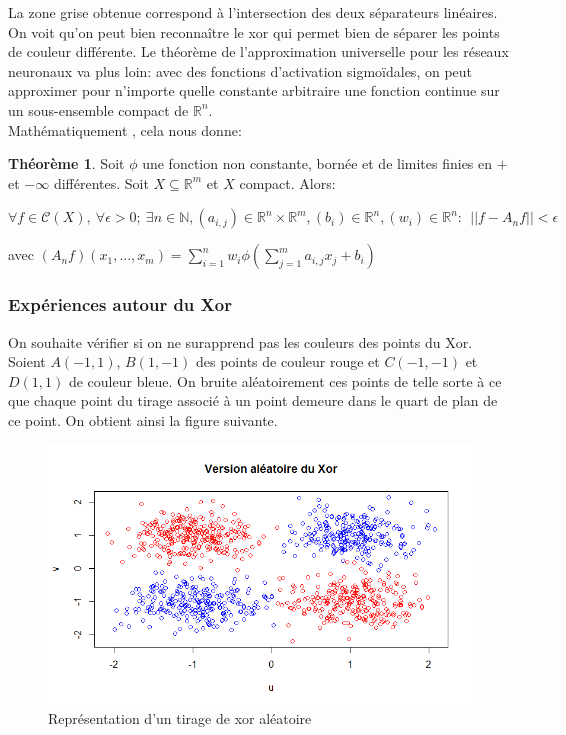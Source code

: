 \documentclass{article}
\theoremstyle{definition}
\newtheorem{thm}{Théorème}
\newcommand{\R}{\mathbb R}
\begin{document}
\noindent La zone grise obtenue correspond à l'intersection des deux séparateurs linéaires. On voit qu'on peut bien reconnaître le xor qui permet bien de séparer les points de couleur différente. Le théorème de l'approximation universelle pour les réseaux neuronaux va plus loin: avec des fonctions d'activation sigmoïdales, on peut approximer pour n'importe quelle constante arbitraire une fonction continue sur un sous-ensemble compact de $\R^n$.\\

\newpage
\noindent Mathématiquement , cela nous donne:
\begin{thm}
Soit $\phi$ une fonction non constante, bornée et de limites finies en $+$ et $-\infty$ différentes. Soit $X \subseteq \R^m$ et $X$ compact. Alors:

\noindent $\forall f \in \mathcal{C}(X),~\forall \epsilon>0;~\exists n\in \mathbb{N},(a_{i,j})\in\R^n\times\R^m,(b_i)\in \R^n,(w_i)\in\R^n:~~||f-A_n f||<\epsilon$

\noindent avec $(A_n f)(x_1,...,x_m)=\displaystyle\sum_{i=1}^n w_i \phi\left(\displaystyle\sum_{j=1}^m a_{i,j}x_j+b_i\right)$
\end{thm}

\subsubsection{Expériences autour du Xor}

\noindent On souhaite vérifier si on ne surapprend pas les couleurs des points du Xor. Soient $A(-1,1)$, $B(1,-1)$ des points de couleur rouge et $C(-1,-1)$ et $D(1,1)$ de couleur bleue. On bruite aléatoirement ces points de telle sorte à ce que chaque point du tirage associé à un point demeure dans le quart de plan de ce point. On obtient ainsi la figure suivante.\\

\begin{figure}[!h]\centering
\includegraphics[scale=0.5]{xoralea.png}
\caption{Représentation d'un tirage de xor aléatoire}
\label{fig:xoralea}%
\end{figure}
\end{document}
